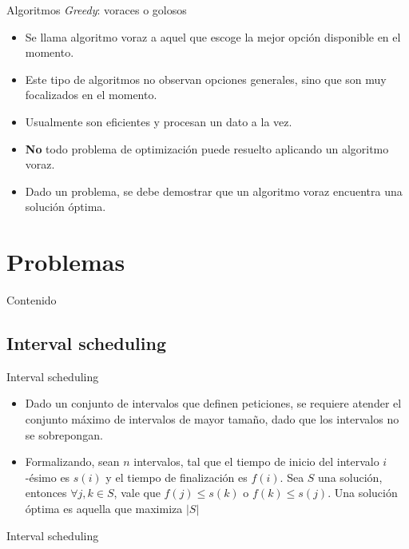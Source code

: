 \documentclass[]{beamer}
\begin{document}
\begin{frame}{Algoritmos \textit{Greedy}: voraces o golosos}
  \begin{itemize}
    \item Se llama algoritmo voraz a aquel que escoge la mejor opci\'on disponible en el momento.
      \pause
    \item Este tipo de algoritmos no observan opciones generales, sino que son muy focalizados en el momento.
      \pause
    \item Usualmente son eficientes y procesan un dato a la vez.
      \pause
    \item \textbf{No} todo problema de optimizaci\'on puede resuelto aplicando un algoritmo voraz.
      \pause
    \item Dado un problema, se debe demostrar que un algoritmo voraz encuentra una soluci\'on \'optima.
  \end{itemize}
\end{frame}

\section{Problemas}
\begin{frame}{Contenido}
\tableofcontents[currentsection]
\end{frame}

\subsection{Interval scheduling}
\begin{frame}{Interval scheduling}
  \begin{itemize}
    \item Dado un conjunto de intervalos que definen peticiones, se requiere atender el conjunto m\'aximo de intervalos de mayor tama\~no, dado que los intervalos no se sobrepongan.
      \pause
    \item Formalizando, sean $n$ intervalos, tal que el tiempo de inicio del intervalo $i$-\'esimo es $s(i)$ y el tiempo de finalizaci\'on es $f(i)$. Sea $S$ una soluci\'on, entonces $ \forall j, k \in S$, vale que $f(j)\leq s(k)$ o $f(k)\leq s(j)$. Una soluci\'on \'optima es aquella que maximiza $|S|$
  \end{itemize}
\end{frame}

\begin{frame}{Interval scheduling}
\end{frame}
\end{document}
